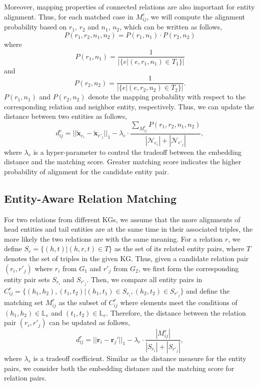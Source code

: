 \documentclass[letterpaper]{article} %
\begin{document}
Moreover, mapping properties of connected relations are also important for entity alignment.
Thus, for each matched case in $M^e_{ij}$, we will compute the alignment probability
based on $r_1$, $r_2$ and $n_1$, $n_2$, which can be written as follows,
\begin{equation}
P(r_1,r_2,n_1,n_2) = P(r_1,n_1) \cdot P(r_2,n_2)
\label{ap}
\end{equation}
where
\begin{equation}
P(r_1,n_1) = \frac{1}{|\{e|(e,r_1,n_1) \in T_1\}|}
\end{equation}
and
\begin{equation}
P(r_2,n_2) = \frac{1}{|\{e|(e,r_2,n_2) \in T_2\}|}.
\end{equation}
$P(r_1,n_1)$ and $P(r_2,n_2)$ denote the mapping probability with respect to
the corresponding relation and neighbor entity, respectively. Thus, we can update the
distance between two entities as follows,
\begin{equation}
d^e_{ij} = || \tilde{\bm{x}}_{e_i} - \tilde{\bm{x}}_{e'_j} ||_{1} -
\lambda_e \cdot \frac{\sum_{M^e_{ij}}
P(r_1,r_2,n_1,n_2)}{|\mathcal{N}_{e_i}| + |\mathcal{N}_{e'_j}|},
\label{eq:de}
\end{equation}
where $\lambda_e$ is a hyper-parameter to control the tradeoff
between the embedding distance and the matching score. Greater
matching score indicates the higher probability of alignment for the
candidate entity pair.


\subsection{Entity-Aware Relation Matching}

For two relations from different KGs, we assume that
the more alignments of head entities and tail entities are
at the same time in their associated triples, the more likely the two
relations are with the same meaning.
For a relation $r$, we define
$S_r = \{ (h,t) | (h,r,t) \in T \}$ as the set of its related entity
pairs, where $T$ denotes the set of triples in the given KG. Thus,
given a candidate relation pair $(r_i, r'_j)$ where $r_i$ from $G_1$
and $r'_j$ from $G_2$, we first form the corresponding entity
pair sets $S_{r_i}$ and $S_{r'_j}$. Then, we compare all entity pairs in $C^r_{ij} =
\{(h_1, h_2), (t_1, t_2) | (h_1,t_1) \in S_{r_i}, (h_2,t_2) \in
S_{r'_j} \}$ and define the matching set $M^r_{ij}$ as the subset of
$C^r_{ij}$ where elements meet the conditions of $(h_1,h_2) \in
\mathbb{L}_e$ and $(t_1,t_2) \in \mathbb{L}_e$. Therefore, the
distance between the relation pair $(r_i, r'_j)$ can be updated as
follows,
\begin{equation}
d^r_{ij} = || \bm{r}_i - \bm{r}_j' ||_{1} - \lambda_r \cdot
\frac{|M^r_{ij}|}{|S_{r_i}| + |S_{r'_j}|}, \label{eq:dr}
\end{equation}
where $\lambda_r$ is a tradeoff coefficient. Similar as the distance
measure for the entity pairs, we consider both the embedding
distance and the matching score for relation pairs.
\end{document}
